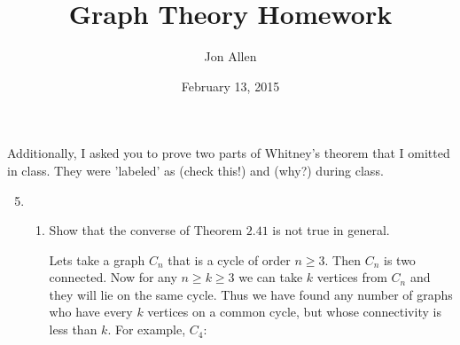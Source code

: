 \documentclass[letterpaper]{article}
\begin{document}
\title{Graph Theory Homework}
\date{February 13, 2015}
\author{Jon Allen}
\maketitle

Additionally, I asked you to prove two parts of Whitney's theorem that I omitted in class.  They were 'labeled' as (check this!) and (why?) during class.




\renewcommand{\labelenumi}{2.\arabic{enumi}}
\renewcommand{\labelenumii}{\arabic{enumii}.}
\renewcommand{\labelenumiii}{(\alph{enumiii})}
\begin{enumerate}
\setcounter{enumi}{4}
\item
  \begin{enumerate}
  \item
  Show that the converse of Theorem $2.41$ is not true in general.

  Lets take a graph $C_n$ that is a cycle of order $n\ge 3$. Then $C_n$ is two connected. Now for any $n\ge k\ge 3$ we can take $k$ vertices from $C_n$ and they will lie on the same cycle. Thus we have found any number of graphs who have every $k$ vertices on a common cycle, but whose connectivity is less than $k$. For example, $C_4$:


\end{enumerate}
\end{enumerate}
\end{document}

